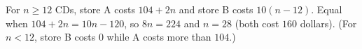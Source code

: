 For $n\ge12$ CDs, store A costs $104+2n$ and store B costs $10(n-12)$. Equal when $104+2n=10n-120$, so $8n=224$ and $n=\boxed{28}$ (both cost $160$ dollars). (For $n<12$, store B costs $0$ while A costs more than $104$.)
